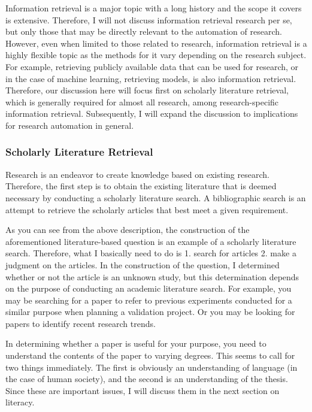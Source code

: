 \documentclass{book}
\begin{document}
Information retrieval is a major topic with a long history and the scope it covers is extensive. Therefore, I will not discuss information retrieval research per se, but only those that may be directly relevant to the automation of research. However, even when limited to those related to research, information retrieval is a highly flexible topic as the methods for it vary depending on the research subject. For example, retrieving publicly available data that can be used for research, or in the case of machine learning, retrieving models, is also information retrieval. Therefore, our discussion here will focus first on scholarly literature retrieval, which is generally required for almost all research, among research-specific information retrieval. Subsequently, I will expand the discussion to implications for research automation in general.

\subsubsection{Scholarly Literature Retrieval}
Research is an endeavor to create knowledge based on existing research. Therefore, the first step is to obtain the existing literature that is deemed necessary by conducting a scholarly literature search. A bibliographic search is an attempt to retrieve the scholarly articles that best meet a given requirement.

As you can see from the above description, the construction of the aforementioned literature-based question is an example of a scholarly literature search. Therefore, what I basically need to do is 1. search for articles 2. make a judgment on the articles. In the construction of the question, I determined whether or not the article is an unknown study, but this determination depends on the purpose of conducting an academic literature search. For example, you may be searching for a paper to refer to previous experiments conducted for a similar purpose when planning a validation project. Or you may be looking for papers to identify recent research trends.

In determining whether a paper is useful for your purpose, you need to understand the contents of the paper to varying degrees. This seems to call for two things immediately. The first is obviously an understanding of language (in the case of human society), and the second is an understanding of the thesis. Since these are important issues, I will discuss them in the next section on literacy.
\end{document}
